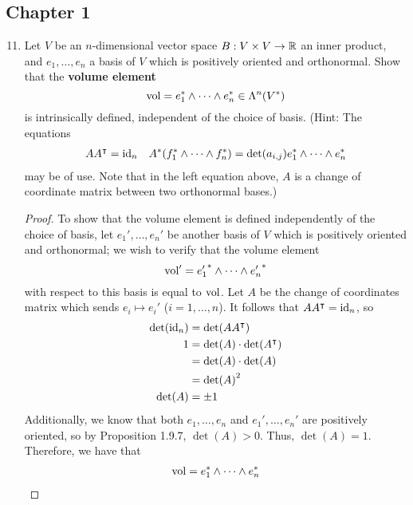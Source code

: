 \documentclass[../psets.tex]{subfiles}
\begin{document}
\subsection*{Chapter 1}
\begin{enumerate}[label={\textbf{1.9.\roman*.}}]
    \setcounter{enumi}{10}
    \item Let $V$ be an $n$-dimensional vector space $B:V\times V\to\R$ an inner product, and $e_1,\dots,e_n$ a basis of $V$ which is positively oriented and orthonormal. Show that the \textbf{volume element}
    \begin{equation*}
        \vol = e_1^*\wedge\cdots\wedge e_n^* \in \lam[n]{V^*}
    \end{equation*}
    is intrinsically defined, independent of the choice of basis. (Hint: The equations
    \begin{align*}
        AA^\intercal &= \id_n&
        A^*(f_1^*\wedge\cdots\wedge f_n^*) = \det(a_{i,j})e_1^*\wedge\cdots\wedge e_n^*
    \end{align*}
    may be of use. Note that in the left equation above, $A$ is a change of coordinate matrix between two orthonormal bases.)
    \begin{proof}
        To show that the volume element is defined independently of the choice of basis, let $e_1',\dots,e_n'$ be another basis of $V$ which is positively oriented and orthonormal; we wish to verify that the volume element
        \begin{equation*}
            \vol' = {e_1'}^*\wedge\cdots\wedge{e_n'}^*
        \end{equation*}
        with respect to this basis is equal to $\vol$. Let $A$ be the change of coordinates matrix which sends $e_i\mapsto e_i'$ ($i=1,\dots,n$). It follows that $AA^\intercal=\id_n$, so
        \begin{align*}
            \det(\id_n) &= \det(AA^\intercal)\\
            1 &= \det(A)\cdot\det(A^\intercal)\\
            &= \det(A)\cdot\det(A)\\
            &= \det(A)^2\\
            \det(A) &= \pm 1
        \end{align*}
        Additionally, we know that both $e_1,\dots,e_n$ and $e_1',\dots,e_n'$ are positively oriented, so by Proposition 1.9.7, $\det(A)>0$. Thus, $\det(A)=1$. Therefore, we have that
        \begin{align*}
            \vol &= e_1^*\wedge\cdots\wedge e_n^*\\

\end{align*}
\end{proof}
\end{enumerate}
\end{document}
